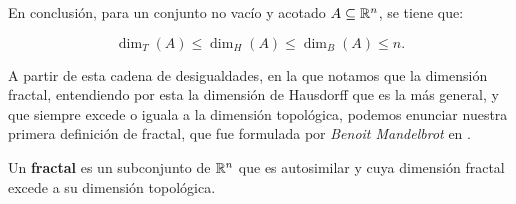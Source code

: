 En conclusión, para un conjunto no vacío y acotado $A\subseteq\mathbb{R}^n$, se tiene que:

\begin{equation}
  \label{eq:desigualdades-dimensiones}
  \dim_T(A)\leq\dim_H(A)\leq\dim_B(A)\leq n.
\end{equation}

A partir de esta cadena de desigualdades, en la que notamos que la dimensión fractal, entendiendo por esta la dimensión de Hausdorff que es la más general, y que siempre excede o iguala a la dimensión topológica, podemos enunciar nuestra primera definición de fractal, que fue formulada por \textit{Benoit Mandelbrot} en \cite{alma991007242979704990}.

\begin{definicion}[Fractal]
\label{def:fractal}
Un \textbf{fractal} es un subconjunto de $\mathbb{R}^n$ que es autosimilar y cuya dimensión fractal excede a su dimensión topológica.
\end{definicion}